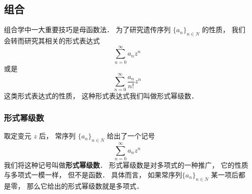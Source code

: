 
\subsection{组合}

组合学中一大重要技巧是母函数法． 为了研究遗传序列 $\{a_n\}_{n \in N}$ 的性质， 我们会转而研究其相关的形式表达式
\begin{equation}
\sum_{n=0}^\infty a_n z^n
\end{equation}
或是
\begin{equation}
\sum_{n=0}^\infty \frac{a_n}{n!}z^n
\end{equation}
这类形式表达式的性质， 这种形式表达式我们叫做形式幂级数．

\subsubsection{形式幂级数}

取定变元 $z$ 后， 常序列 $\{a_n\}_{n\in N}$ 给出了一个记号
\begin{equation}
\sum_{n=0}^\infty a_n z^n
\end{equation}
我们将这种记号叫做\textbf{形式幂级数}． 形式幂级数是对多项式的一种推广， 它的性质与多项式一模一样， 但不是函数． 具体而言， 如果常序列$\{a_n\}_{n\in N}$ 某一项后都是零， 那么它给出的形式幂级数就是多项式．
